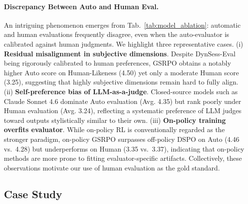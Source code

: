 \paragraph{Discrepancy Between Auto and Human Eval.}
An intriguing phenomenon emerges from Tab.~\ref{tab:model_ablation}: automatic and human evaluations frequently disagree, even when the auto-evaluator is calibrated against human judgments. We highlight three representative cases.
(i) \textbf{Residual misalignment in subjective dimensions}. Despite DynSess-Eval being rigorously calibrated to human preferences, GSRPO obtains a notably higher Auto score on Human-Likeness (4.50) yet only a moderate Human score (3.25), suggesting that highly subjective dimensions remain hard to fully align.
(ii) \textbf{Self-preference bias of LLM-as-a-judge}. Closed-source models such as Claude Sonnet 4.6 dominate Auto evaluation (Avg. 4.35) but rank poorly under Human evaluation (Avg. 3.24), reflecting a systematic preference of LLM judges toward outputs stylistically similar to their own.
(iii) \textbf{On-policy training overfits evaluator}. While on-policy RL is conventionally regarded as the stronger paradigm, on-policy GSRPO surpasses off-policy DSPO on Auto (4.46 vs.\ 4.28) but underperforms on Human (3.35 vs.\ 3.37), indicating that on-policy methods are more prone to fitting evaluator-specific artifacts.
Collectively, these observations motivate our use of human evaluation as the gold standard.

\subsection{Case Study}




